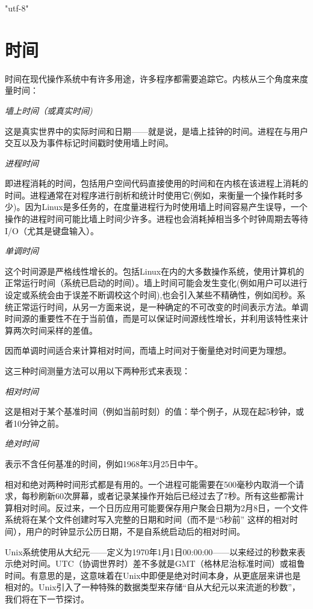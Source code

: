 \ifx\atempxetex\usewhat
\XeTeXinputencoding "utf-8"
\fi
{}

\chapter{时间}

时间在现代操作系统中有许多用途，许多程序都需要追踪它。内核从三个角度来度量时间：

\textit{墙上时间（或真实时间)}

这是真实世界中的实际时间和日期——就是说，是墙上挂钟的时间。进程在与用户交互以及为事件标记时间戳时使用墙上时间。

\textit{进程时间}

即进程消耗的时间，包括用户空间代码直接使用的时间和在内核在该进程上消耗的时间。进程通常在对程序进行剖析和统计时使用它(例如，来衡量一个操作耗时多少)。因为Linux是多任务的，在度量进程行为时使用墙上时间容易产生误导，一个操作的进程时间可能比墙上时间少许多。进程也会消耗掉相当多个时钟周期去等待I/O（尤其是键盘输入）。

\textit{单调时间}

这个时间源是严格线性增长的。包括Linux在内的大多数操作系统，使用计算机的正常运行时间（系统已启动的时间）。墙上时间可能会发生变化(例如用户可以进行设定或系统会由于误差不断调校这个时间),也会引入某些不精确性，例如闰秒。系统正常运行时间，从另一方面来说，是一种确定的不可改变的时间表示方法。单调时间源的重要性不在于当前值，而是可以保证时间源线性增长，并利用该特性来计算两次时间采样的差值。

因而单调时间适合来计算相对时间，而墙上时间对于衡量绝对时间更为理想。

这三种时间测量方法可以用以下两种形式来表现： 

\textit{相对时间}

这是相对于某个基准时间（例如当前时刻）的值：举个例子，从现在起5秒钟，或者10分钟之前。

\textit{绝对时间}

表示不含任何基准的时间，例如1968年3月25日中午。 

相对和绝对两种时间形式都是有用的。一个进程可能需要在500毫秒内取消一个请求，每秒刷新60次屏幕，或者记录某操作开始后已经过去了7秒。所有这些都需计算相对时间。反过来，一个日历应用可能要保存用户聚会日期为2月8日，一个文件系统将在某个文件创建时写入完整的日期和时间（而不是“5秒前” 这样的相对时间），用户的时钟显示公历日期，不是自系统启动后的相对时间。

Unix系统使用从大纪元——定义为1970年1月1日00:00:00——以来经过的秒数来表示绝对时间。UTC（协调世界时）差不多就是GMT（格林尼治标准时间）或祖鲁时间。有意思的是，这意味着在Unix中即便是绝对时间本身，从更底层来讲也是相对的。Unix引入了一种特殊的数据类型来存储“自从大纪元以来流逝的秒数”，我们将在下一节探讨。

